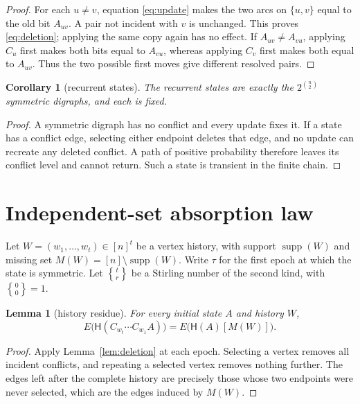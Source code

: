 \documentclass[a4paper,10pt]{amsart}
\newtheorem{lemma}[theorem]{Lemma}
\newtheorem{corollary}[theorem]{Corollary}
\theoremstyle{remark}
\newcommand{\Conf}{\mathsf H}
\newcommand{\supp}{\operatorname{supp}}
\newcommand{\Stir}[2]{\genfrac\{\}{0pt}{}{#1}{#2}}
\begin{document}
\begin{proof}
For each $u\ne v$, equation \eqref{eq:update} makes the two arcs on
$\{u,v\}$ equal to the old bit $A_{uv}$.  A pair not incident with $v$ is
unchanged.  This proves \eqref{eq:deletion}; applying the same copy again has
no effect.  If $A_{uv}\ne A_{vu}$, applying $C_u$ first makes both bits equal
to $A_{vu}$, whereas applying $C_v$ first makes both equal to $A_{uv}$.
Thus the two possible first moves give different resolved pairs.
\end{proof}

\begin{corollary}[recurrent states]\label{cor:recurrent}
The recurrent states are exactly the $2^{\binom n2}$ symmetric digraphs, and
each is fixed.
\end{corollary}

\begin{proof}
A symmetric digraph has no conflict and every update fixes it.  If a state has
a conflict edge, selecting either endpoint deletes that edge, and no update
can recreate any deleted conflict.  A path of positive probability therefore
leaves its conflict level and cannot return.  Such a state is transient in
the finite chain.
\end{proof}

\section{Independent-set absorption law}

Let $W=(w_1,\ldots,w_t)\in[n]^t$ be a vertex history, with support
$\supp(W)$ and missing set $M(W)=[n]\setminus\supp(W)$.  Write $\tau$ for
the first epoch at which the state is symmetric.  Let
$\Stir{t}{r}$ be a Stirling number of the second kind, with
$\Stir00=1$.

\begin{lemma}[history residue]\label{lem:history}
For every initial state $A$ and history $W$,
\begin{equation}\label{eq:history}
 E\bigl(\Conf(C_{w_t}\cdots C_{w_1}A)\bigr)
 =E\bigl(\Conf(A)[M(W)]\bigr).
\end{equation}
\end{lemma}

\begin{proof}
Apply Lemma~\ref{lem:deletion} at each epoch.  Selecting a vertex removes all
incident conflicts, and repeating a selected vertex removes nothing further.
The edges left after the complete history are precisely those whose two
endpoints were never selected, which are the edges induced by $M(W)$.
\end{proof}
\end{document}
